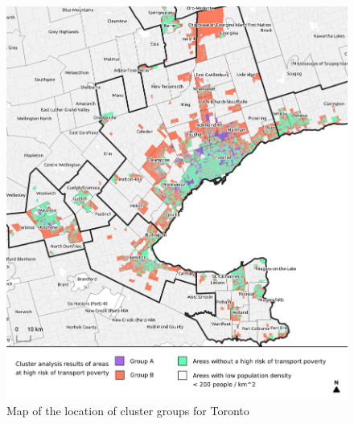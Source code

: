 \documentclass[11 pt, letterpaper]{article}
\begin{document}
{\begin{figure}[H]
	\caption{Map of the location of cluster groups for Toronto} 
	\label{C_tor}
	\centerline{\includegraphics[width=6.5in]{figures/cluster_maps/C_tor}}
	\vspace{2mm}
\end{figure}

}
\end{document}
